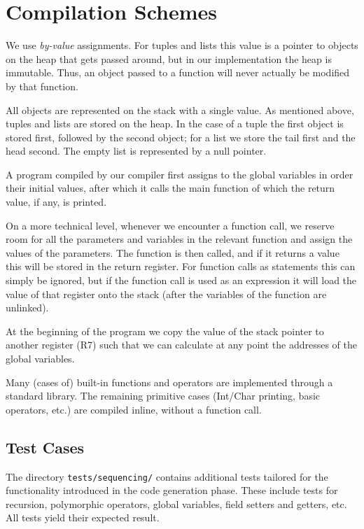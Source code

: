 \documentclass[a4paper]{article}
\begin{document}
\section{Compilation Schemes}

We use \emph{by-value} assignments.
For tuples and lists this value is a pointer to objects on the heap that gets passed around, but in our implementation the heap is immutable.
Thus, an object passed to a function will never actually be modified by that function.

All objects are represented on the stack with a single value.
As mentioned above, tuples and lists are stored on the heap.
In the case of a tuple the first object is stored first, followed by the second object; for a list we store the tail first and the head second.
The empty list is represented by a null pointer.

A program compiled by our compiler first assigns to the global variables in order their initial values, after which it calls the main function of which the return value, if any, is printed.

On a more technical level, whenever we encounter a function call, we reserve room for all the parameters and variables in the relevant function and assign the values of the parameters.
The function is then called, and if it returns a value this will be stored in the return register.
For function calls as statements this can simply be ignored, but if the function call is used as an expression it will load the value of that register onto the stack (after the variables of the function are unlinked).

At the beginning of the program we copy the value of the stack pointer to another register (R7) such that we can calculate at any point the addresses of the global variables.

Many (cases of) built-in functions and operators are implemented through a standard library.
The remaining primitive cases (Int/Char printing, basic operators, etc.) are compiled inline, without a function call.

\subsection{Test Cases}

The directory \verb|tests/sequencing/| contains additional tests tailored for the functionality introduced in the code generation phase.
These include tests for recursion, polymorphic operators, global variables, field setters and getters, etc. All tests yield their expected result.
\end{document}
